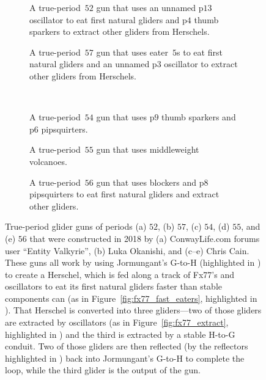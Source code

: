 \begin{figure}[!htb]
	\centering
	\begin{subfigure}{0.47\textwidth}
		\centering
		\caption{A true-period~$52$ gun that uses an unnamed p$13$ oscillator to eat first natural gliders and p$4$ thumb sparkers to extract other gliders from Herschels.}
		\label{fig:p52_gun}
	\end{subfigure} \hfill \begin{subfigure}{0.49\textwidth}
		\centering
		\caption{A true-period~$57$ gun that uses eater~$5$s to eat first natural gliders and an unnamed p$3$ oscillator to extract other gliders from Herschels.}
		\label{fig:p57_gun}
	\end{subfigure} \\[0.4cm]
	\begin{subfigure}{0.3\textwidth}
		\centering
		\caption{A true-period~$54$ gun that uses p$9$ thumb sparkers and p$6$ pipsquirters.}
		\label{fig:p54_gun}
	\end{subfigure} \hfill
	\begin{subfigure}{0.26\textwidth}
		\centering
		\caption{A true-period~$55$ gun that uses middleweight volcanoes.}
		\label{fig:p55_gun}
	\end{subfigure} \hfill
	\begin{subfigure}{0.37\textwidth}
		\centering
		\caption{A true-period~$56$ gun that uses blockers and p$8$ pipsquirters to eat first natural gliders and extract other gliders.}
		\label{fig:p56_gun}
	\end{subfigure}
	\caption{True-period glider guns of periods (a) $52$, (b) $57$, (c) $54$, (d) $55$, and (e) $56$ that were constructed in 2018 by (a) ConwayLife.com forums user ``Entity Valkyrie'', (b) Luka Okanishi, and (c--e) Chris Cain. These guns all work by using Jormungant's G-to-H (highlighted in ) to create a Herschel, which is fed along a track of Fx77's and oscillators to eat its first natural gliders faster than stable components can (as in Figure~\ref{fig:fx77_fast_eaters}, highlighted in ). That Herschel is converted into three gliders---two of those gliders are extracted by oscillators (as in Figure~\ref{fig:fx77_extract}, highlighted in ) and the third is extracted by a stable H-to-G conduit. Two of those gliders are then reflected (by the reflectors highlighted in ) back into Jormungant's G-to-H to complete the loop, while the third glider is the output of the gun.}
	\label{fig:quetzals}
\end{figure}

